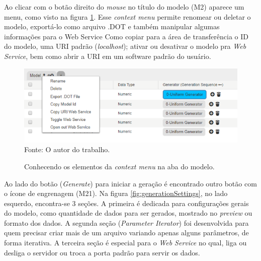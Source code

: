 \documentclass[
	12pt,				%
	openright,			%
	oneside,			%
	a4paper,			%
	english,			%
	brazil				%
	]{abntex2}
\begin{document}
		\par
		Ao clicar com o botão direito do \emph{mouse} no título do modelo (M2) aparece um menu, como visto na figura \ref{fig:contextMenu}.
		Esse \emph{context menu} permite renomear ou deletar o modelo, exportá-lo como arquivo .DOT e também manipular algumas informações para o Web Service Como
			copiar para a área de transferência o ID do modelo, uma URI padrão (\emph{localhost}); ativar ou desativar o modelo pra \emph{Web Service}, bem como abrir a URI em um software padrão do usuário.
		\begin{figure}[h]
			\centering
			\caption{Conhecendo os elementos da \emph{context menu} na aba do modelo.}
			\includegraphics[width=\linewidth]{./figures/prototipo/contextMenu.png}
			\label{fig:contextMenu}
			\footnotesize Fonte: O autor do trabalho.
		\end{figure}
		\par
		Ao lado do botão (\emph{Generate}) para iniciar a geração é encontrado outro botão com o ícone de engrenagem (M21).
		Na figura \ref{fig:generationSettings}, no lado esquerdo, encontra-se 3 seções.
		A primeira é dedicada para configurações gerais do modelo, como quantidade de dados para ser gerados, mostrado no \emph{preview} ou formato dos dados.
		A segunda seção (\emph{Parameter Iterator}) foi desenvolvida para quem precisar criar mais de um arquivo variando apenas alguns parâmetros, de forma iterativa.
		A terceira seção é especial para o \emph{Web Service} no qual, liga ou desliga o servidor ou troca a porta padrão para servir os dados.
		
\end{document}
